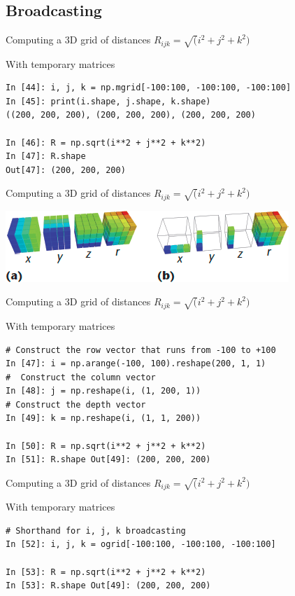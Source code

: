\subsection{Broadcasting}
\begin{frame}[fragile]
 Computing a 3D grid of distances $R_{ijk} = \sqrt(i^2 + j^2 + k^2)$
 \begin{block}{With temporary matrices}
   \begin{verbatim}
In [44]: i, j, k = np.mgrid[-100:100, -100:100, -100:100]
In [45]: print(i.shape, j.shape, k.shape)
((200, 200, 200), (200, 200, 200), (200, 200, 200)

In [46]: R = np.sqrt(i**2 + j**2 + k**2)
In [47]: R.shape
Out[47]: (200, 200, 200)
\end{verbatim}
\end{block}
\end{frame}


\begin{frame}[fragile]
 Computing a 3D grid of distances $R_{ijk} = \sqrt(i^2 + j^2 + k^2)$
 \begin{center}
   \includegraphics[scale=.5]{../figures/numpy/broadcasting.png}
 \end{center}
\end{frame}

\begin{frame}[fragile]
 Computing a 3D grid of distances $R_{ijk} = \sqrt(i^2 + j^2 + k^2)$
 \begin{block}{With temporary matrices}
   \begin{verbatim}
# Construct the row vector that runs from -100 to +100
In [47]: i = np.arange(-100, 100).reshape(200, 1, 1)
#  Construct the column vector
In [48]: j = np.reshape(i, (1, 200, 1))
# Construct the depth vector
In [49]: k = np.reshape(i, (1, 1, 200))

In [50]: R = np.sqrt(i**2 + j**2 + k**2)
In [51]: R.shape Out[49]: (200, 200, 200)
\end{verbatim}
 \end{block}
\end{frame}

\begin{frame}[fragile]
 Computing a 3D grid of distances $R_{ijk} = \sqrt(i^2 + j^2 + k^2)$
 \begin{block}{With temporary matrices}
   \begin{verbatim}
# Shorthand for i, j, k broadcasting
In [52]: i, j, k = ogrid[-100:100, -100:100, -100:100]

In [53]: R = np.sqrt(i**2 + j**2 + k**2)
In [53]: R.shape Out[49]: (200, 200, 200)
\end{verbatim}
 \end{block}
\end{frame}
